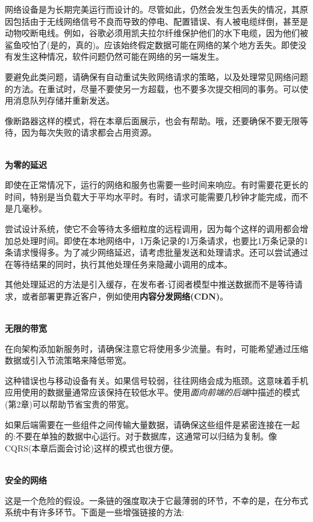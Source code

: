 网络设备是为长期完美运行而设计的。尽管如此，仍然会发生包丢失的情况，其原因包括由于无线网络信号不良而导致的停电、配置错误、有人被电缆绊倒，甚至是动物咬断电线。例如，谷歌必须用凯夫拉尔纤维保护他们的水下电缆，因为他们被鲨鱼咬怕了(是的，真的)。应该始终假定数据可能在网络的某个地方丢失。即使没有发生这种情况，软件问题仍然可能在网络的另一端发生。

要避免此类问题，请确保有自动重试失败网络请求的策略，以及处理常见网络问题的方法。在重试时，尽量不要使另一方超载，也不要多次提交相同的事务。可以使用消息队列存储并重新发送。

像断路器这样的模式，将在本章后面展示，也会有帮助。哦，还要确保不要无限等待，因为每次失败的请求都会占用资源。

\hspace*{\fill} \\ %
\noindent
\textbf{为零的延迟}

即使在正常情况下，运行的网络和服务也需要一些时间来响应。有时需要花更长的时间，特别是当负载大于平均水平时。有时，请求可能需要几秒钟才能完成，而不是几毫秒。

尝试设计系统，使它不会等待太多细粒度的远程调用，因为每个这样的调用都会增加总处理时间。即使在本地网络中，1万条记录的1万条请求，也要比1万条记录的1条请求慢得多。为了减少网络延迟，请考虑批量发送和处理请求。还可以尝试通过在等待结果的同时，执行其他处理任务来隐藏小调用的成本。

其他处理延迟的方法是引入缓存，在发布者-订阅者模型中推送数据而不是等待请求，或者部署更靠近客户，例如使用\textbf{内容分发网络(CDN)}。

\hspace*{\fill} \\ %
\noindent
\textbf{无限的带宽}

在向架构添加新服务时，请确保注意它将使用多少流量。有时，可能希望通过压缩数据或引入节流策略来降低带宽。

这种错误也与移动设备有关。如果信号较弱，往往网络会成为瓶颈。这意味着手机应用使用的数据量通常应该保持在较低水平。使用\textit{面向前端的后端}中描述的模式(第2章)可以帮助节省宝贵的带宽。

如果后端需要在一些组件之间传输大量数据，请确保这些组件是紧密连接在一起的:不要在单独的数据中心运行。对于数据库，这通常可以归结为复制。像CQRS(本章后面会讨论)这样的模式也很方便。

\hspace*{\fill} \\ %
\noindent
\textbf{安全的网络}

这是一个危险的假设。一条链的强度取决于它最薄弱的环节，不幸的是，在分布式系统中有许多环节。下面是一些增强链接的方法:

